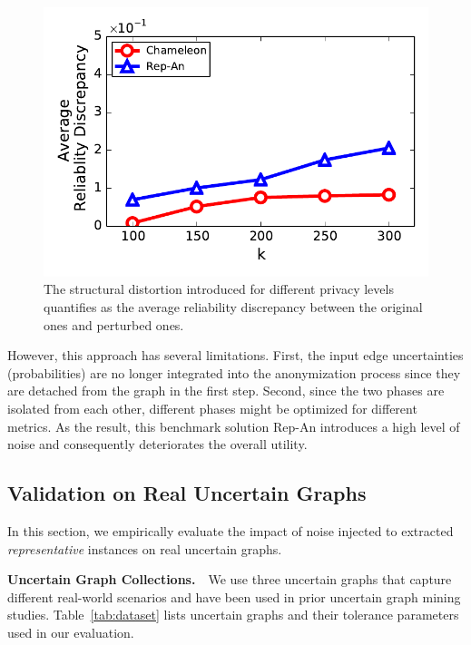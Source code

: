 \begin{figure}[!htb]
{\begin{minipage}[l]{0.62\columnwidth}
        \includegraphics[width=1\linewidth]{rep_exp/ppi_rel.pdf}
      \end{minipage}
      }

    \vspace{-10pt}
    \caption{The structural distortion introduced for different privacy levels quantifies as the average reliability discrepancy between the original ones and perturbed ones.}
    \label{fig:rep_exp}
    \vspace{-5pt}
\end{figure}

However, this approach has several limitations. First, the input edge uncertainties (probabilities) are no longer integrated into the anonymization process since they are detached from the graph in the first step. Second, since the two phases are isolated from each other, different phases might be optimized for different metrics. As the result, this benchmark solution Rep-An introduces a high level of noise and consequently deteriorates the overall utility.

\subsection{Validation on Real Uncertain Graphs}
In this section, we empirically evaluate the impact of noise injected to extracted \emph{representative} instances on real uncertain graphs. 

\textbf{Uncertain Graph Collections.}~~We use three uncertain graphs that capture different real-world scenarios and have been used in prior uncertain graph mining studies. Table~\ref{tab:dataset} lists uncertain graphs and their tolerance parameters used in our evaluation.

